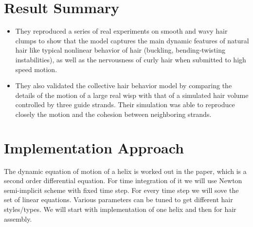 \documentclass[paper=a4, fontsize=11pt]{scrartcl}
\begin{document}
\section{Result Summary}
\begin{itemize}
\item They reproduced a series of real experiments on smooth and wavy hair clumps to show that the model captures the main dynamic features of natural hair like typical nonlinear behavior of hair (buckling, bending-twisting instabilities), as well as the nervousness of curly hair when submitted to high speed motion.
\item They also validated the collective hair behavior model by comparing the details of the motion of a large real wisp with that of a simulated hair volume controlled by three guide strands. Their simulation was able to reproduce closely the motion and the cohesion between neighboring strands.
\end{itemize}
\section{Implementation Approach}
The dynamic equation of motion of a helix is worked out in the paper, which is a second order differential equation. For time integration of it we will use Newton semi-implicit scheme with fixed time step. For every time step we will sove the set of linear equations. Various parameters can be tuned to get different hair styles/types. We will start with implementation of one helix and then for hair assembly.
\end{document}
